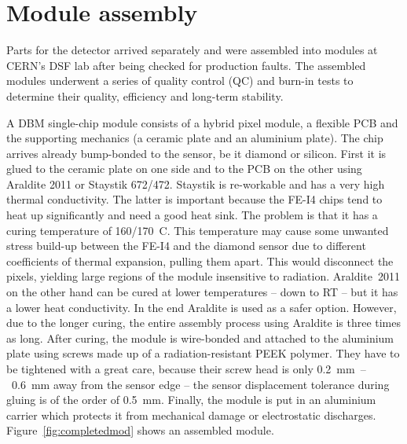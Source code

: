 \section{Module assembly}
\label{sec:modass}
Parts for the detector arrived separately and were assembled into modules at CERN's DSF lab after being checked for production faults. The assembled modules underwent a series of quality control (QC) and burn-in tests to determine their quality, efficiency and long-term stability.

A DBM single-chip module consists of a hybrid pixel module, a flexible PCB and the supporting mechanics (a ceramic plate and an aluminium plate). The chip arrives already bump-bonded to the sensor, be it diamond or silicon. First it is glued to the ceramic plate on one side and to the PCB on the other using Araldite 2011 or Staystik 672/472. 
Staystik is re-workable and has a very high thermal conductivity. The latter is important because the FE-I4 chips tend to heat up significantly and need a good heat sink. The problem is that it has a curing temperature of 160/170~\textdegree C. This temperature may cause some unwanted stress build-up between the FE-I4 and the diamond sensor due to different coefficients of thermal expansion, pulling them apart. This would disconnect the pixels, yielding large regions of the module insensitive to radiation. Araldite~2011 on the other hand can be cured at lower temperatures -- down to RT -- but it has a lower heat conductivity. In the end Araldite is used as a safer option. However, due to the longer curing, the entire assembly process using Araldite is three times as long. After curing, the module is wire-bonded and attached to the aluminium plate using screws made up of a radiation-resistant PEEK polymer. They have to be tightened with a great care, because their screw head is only 0.2~mm~--~0.6~mm away from the sensor edge -- the sensor displacement tolerance during gluing is of the order of 0.5~mm. Finally, the module is put in an aluminium carrier which protects it from mechanical damage or electrostatic discharges. Figure~\ref{fig:completedmod} shows an assembled module.


